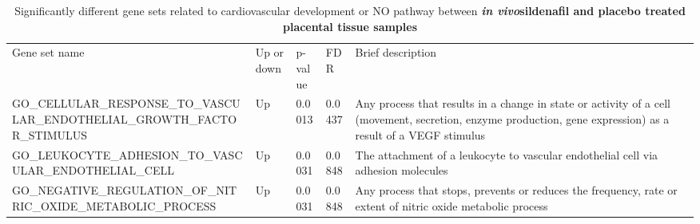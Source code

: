 \documentclass[authordate, empirical,issue]{jote-new-article}
\begin{document}
\begin{table}[h!]
  \begin{fullwidth}
    \caption{Significantly different gene sets related to cardiovascular development or NO pathway between \emph{\textbf{in vivo}}\textbf{sildenafil and placebo treated placental tissue samples}}

    \begin{tabularx}{\linewidth}{@{} X l l l X @{}}
      Gene set name                                                               & Up or down                                                                                                   & p-value                                                                                                                                                      & FDR    & Brief description                                                                                                              \\

      GO\_CELLULAR\_RESPONSE\_TO\_VASCULAR\_ENDOTHELIAL\_GROWTH\_FACTOR\_STIMULUS & Up                                                                                                          &
      0.0013                                                                      & 0.0437                                                                                                      & Any process that results in a change in state or activity of a cell (movement, secretion, enzyme production, gene expression) as a result of a VEGF stimulus
      \\

      GO\_LEUKOCYTE\_ADHESION\_TO\_VASCULAR\_ENDOTHELIAL\_CELL                    & Up                                                                                                          & 0.0031                                                                                                                                                       & 0.0848
                                                                                  & The attachment of a leukocyte to vascular endothelial cell via adhesion molecules
      \\

      GO\_NEGATIVE\_REGULATION\_OF\_NITRIC\_OXIDE\_METABOLIC\_PROCESS             & Up                                                                                                          & 0.0031                                                                                                                                                       & 0.0848
                                                                                  & Any process that stops, prevents or reduces the frequency, rate or extent of nitric oxide metabolic process
      \\


\end{tabularx}
\end{fullwidth}
\end{table}
\end{document}
